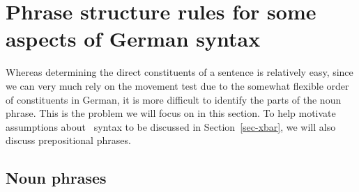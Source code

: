 

\section{Phrase structure rules for some aspects of German syntax}

Whereas determining the direct constituents of a sentence is relatively easy, since we can very much rely on the movement test due to the
somewhat flexible order of constituents in German, it is more difficult to identify the parts of the noun phrase. This is the problem
we will focus on in this section. To help motivate assumptions about \xbar~syntax to be discussed in Section~\ref{sec-xbar},
we will also discuss prepositional phrases.


\subsection{Noun phrases}
\label{sec-psg-np}

